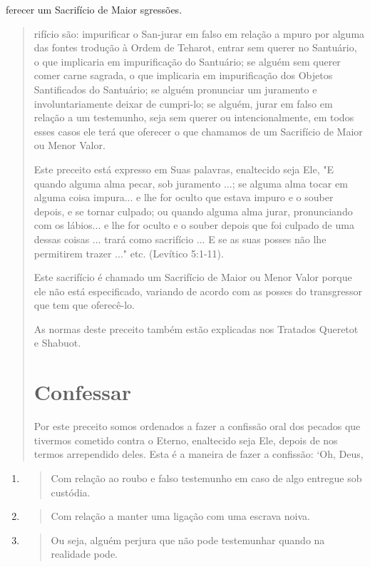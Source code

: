 ferecer um Sacrifício de Maior sgressões.

\begin{quote}
rifício são: impurificar o San-jurar em falso em relação a mpuro por
alguma das fontes trodução à Ordem de Teharot, entrar sem querer no
Santuário, o que implicaria em impurificação do Santuá­rio; se alguém
sem querer comer carne sagrada, o que implicaria em impurifi­cação dos
Objetos Santificados do Santuário; se alguém pronunciar um jura­mento e
involuntariamente deixar de cumpri-lo; se alguém, jurar em falso em
relação a um testemunho, seja sem querer ou intencionalmente, em todos
es­ses casos ele terá que oferecer o que chamamos de um Sacrifício de
Maior ou Menor Valor.

Este preceito está expresso em Suas palavras, enaltecido seja Ele, "E
quando alguma alma pecar, sob juramento ...; se alguma alma tocar em
alguma coisa impura... e lhe for oculto que estava impuro e o souber
depois, e se tor­nar culpado; ou quando alguma alma jurar, pronunciando
com os lábios... e lhe for oculto e o souber depois que foi culpado de
uma dessas coisas ... trará como sacrifício ... E se as suas posses não
lhe permitirem trazer ..." etc. (Levíti­co 5:1-11).

Este sacrifício é chamado um Sacrifício de Maior ou Menor Valor por­que
ele não está especificado, variando de acordo com as posses do
transgres­sor que tem que oferecê-lo.

As normas deste preceito também estão explicadas nos Tratados Que­retot
e Shabuot.

\section{Confessar}

Por este preceito somos ordenados a fazer a confissão oral dos peca­dos
que tivermos cometido contra o Eterno, enaltecido seja Ele, depois de
nos termos arrependido deles. Esta é a maneira de fazer a confissão:
`Oh, Deus,
\end{quote}

\begin{enumerate}
\def\labelenumi{\arabic{enumi}.}
\setcounter{enumi}{89}
\item
 \begin{quote}
 Com relação ao roubo e falso testemunho em caso de algo entregue sob
 custódia.
 \end{quote}
\item
 \begin{quote}
 Com relação a manter uma ligação com uma escrava noiva.
 \end{quote}
\item
 \begin{quote}
 Ou seja, alguém perjura que não pode testemunhar quando na realidade
 pode.
 \end{quote}
\end{enumerate}

